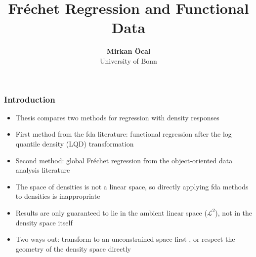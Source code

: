 \documentclass[11pt, aspectratio=169]{beamer}
\begin{document}
\title{Fréchet Regression and Functional Data}

\author[Mirkan Öcal]
{
{\bf Mirkan Öcal}\\
{\small University of Bonn}\\[1ex]
}


\begin{frame}
    \titlepage
    \note{~}
\end{frame}


\begin{frame}[allowframebreaks]
    \frametitle{Introduction}
    \begin{itemize}
        \item Thesis compares two methods for regression with density responses
        \item First method from the fda literature: functional regression after the
        log quantile density (LQD) transformation
        \parencites{PetersenMüller2016}{KokoszkaEtAl2019}
        \item Second method: global Fréchet regression from the object-oriented data
        analysis literature \parencite{PetersenMüller2019}
    \end{itemize}
    \framebreak
    \begin{itemize}
        \item The space of densities is not a linear space, so directly applying fda
        methods to densities is inappropriate
        \item Results are only guaranteed to lie in the ambient linear space
        ($\mathcal{L}^2$), not in the density space itself
        \item Two ways out: transform to an unconstrained space first
        \parencite{PetersenMüller2016}, or respect the geometry of the density space
        directly \parencite{PetersenMüller2019}
    \end{itemize}
\end{frame}
\end{document}
